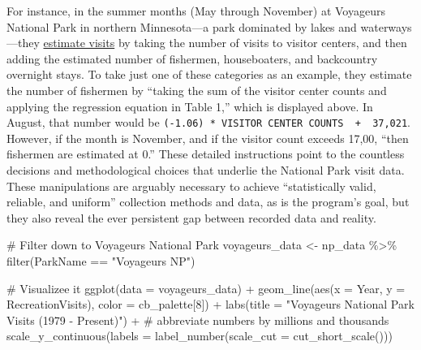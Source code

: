 \documentclass[
  letterpaper,
  DIV=11,
  numbers=noendperiod]{scrartcl}
\newenvironment{Shaded}{\begin{snugshade}}{\end{snugshade}}
\newcommand{\AttributeTok}[1]{\textcolor[rgb]{0.40,0.45,0.13}{#1}}
\newcommand{\CommentTok}[1]{\textcolor[rgb]{0.37,0.37,0.37}{#1}}
\newcommand{\DecValTok}[1]{\textcolor[rgb]{0.68,0.00,0.00}{#1}}
\newcommand{\FunctionTok}[1]{\textcolor[rgb]{0.28,0.35,0.67}{#1}}
\newcommand{\NormalTok}[1]{\textcolor[rgb]{0.00,0.23,0.31}{#1}}
\newcommand{\OtherTok}[1]{\textcolor[rgb]{0.00,0.23,0.31}{#1}}
\newcommand{\SpecialCharTok}[1]{\textcolor[rgb]{0.37,0.37,0.37}{#1}}
\newcommand{\StringTok}[1]{\textcolor[rgb]{0.13,0.47,0.30}{#1}}
\begin{document}
For instance, in the summer months (May through November) at Voyageurs
National Park in northern Minnesota---a park dominated by lakes and
waterways---they \href{https://irma.nps.gov/Stats/Reports/Park}{estimate
visits} by taking the number of visits to visitor centers, and then
adding the estimated number of fishermen, houseboaters, and backcountry
overnight stays. To take just one of these categories as an example,
they estimate the number of fishermen by ``taking the sum of the visitor
center counts and applying the regression equation in Table 1,'' which
is displayed above. In August, that number would be
\texttt{(-1.06)\ *\ VISITOR\ CENTER\ COUNTS\ \ +\ \ 37,021}. However, if
the month is November, and if the visitor count exceeds 17,00, ``then
fishermen are estimated at 0.'' These detailed instructions point to the
countless decisions and methodological choices that underlie the
National Park visit data. These manipulations are arguably necessary to
achieve ``statistically valid, reliable, and uniform'' collection
methods and data, as is the program's goal, but they also reveal the
ever persistent gap between recorded data and reality.

\begin{Shaded}
\begin{Highlighting}[]
\CommentTok{\# Filter down to Voyageurs National Park}
\NormalTok{voyageurs\_data }\OtherTok{\textless{}{-}}\NormalTok{ np\_data }\SpecialCharTok{\%\textgreater{}\%} \FunctionTok{filter}\NormalTok{(ParkName }\SpecialCharTok{==} \StringTok{"Voyageurs NP"}\NormalTok{)}

\CommentTok{\# Visualizee it}
\FunctionTok{ggplot}\NormalTok{(}\AttributeTok{data =}\NormalTok{ voyageurs\_data) }\SpecialCharTok{+} 
  \FunctionTok{geom\_line}\NormalTok{(}\FunctionTok{aes}\NormalTok{(}\AttributeTok{x =}\NormalTok{ Year, }\AttributeTok{y =}\NormalTok{ RecreationVisits), }\AttributeTok{color =}\NormalTok{ cb\_palette[}\DecValTok{8}\NormalTok{]) }\SpecialCharTok{+} 
  \FunctionTok{labs}\NormalTok{(}\AttributeTok{title =} \StringTok{"Voyageurs National Park Visits (1979 {-} Present)"}\NormalTok{) }\SpecialCharTok{+}
  \CommentTok{\# abbreviate numbers by millions and thousands}
  \FunctionTok{scale\_y\_continuous}\NormalTok{(}\AttributeTok{labels =} \FunctionTok{label\_number}\NormalTok{(}\AttributeTok{scale\_cut =} \FunctionTok{cut\_short\_scale}\NormalTok{()))}
\end{Highlighting}
\end{Shaded}
\end{document}
